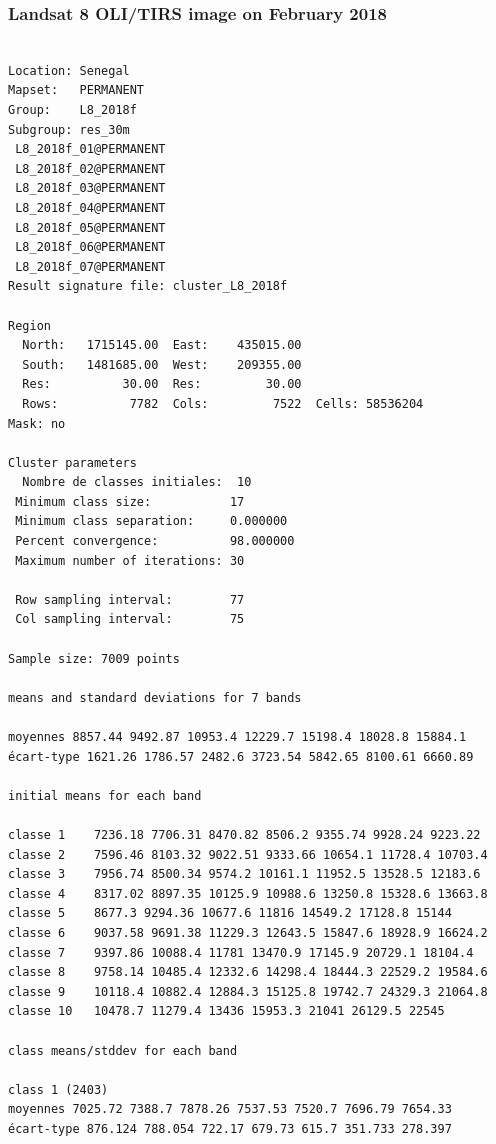 \documentclass[earth,article,submit,pdftex,moreauthors]{Definitions/mdpi}
\begin{document}
\subsubsection[\appendixname~\thesubsubsection]{Landsat 8 OLI/TIRS image on February 2018}
\begin{scriptsize}
\begin{verbatim}

Location: Senegal
Mapset:   PERMANENT
Group:    L8_2018f
Subgroup: res_30m
 L8_2018f_01@PERMANENT
 L8_2018f_02@PERMANENT
 L8_2018f_03@PERMANENT
 L8_2018f_04@PERMANENT
 L8_2018f_05@PERMANENT
 L8_2018f_06@PERMANENT
 L8_2018f_07@PERMANENT
Result signature file: cluster_L8_2018f

Region
  North:   1715145.00  East:    435015.00
  South:   1481685.00  West:    209355.00
  Res:          30.00  Res:         30.00
  Rows:          7782  Cols:         7522  Cells: 58536204
Mask: no

Cluster parameters
  Nombre de classes initiales: 	10
 Minimum class size:           17
 Minimum class separation:     0.000000
 Percent convergence:          98.000000
 Maximum number of iterations: 30

 Row sampling interval:        77
 Col sampling interval:        75

Sample size: 7009 points

means and standard deviations for 7 bands

moyennes 8857.44 9492.87 10953.4 12229.7 15198.4 18028.8 15884.1
écart-type 1621.26 1786.57 2482.6 3723.54 5842.65 8100.61 6660.89

initial means for each band

classe 1    7236.18 7706.31 8470.82 8506.2 9355.74 9928.24 9223.22
classe 2    7596.46 8103.32 9022.51 9333.66 10654.1 11728.4 10703.4
classe 3    7956.74 8500.34 9574.2 10161.1 11952.5 13528.5 12183.6
classe 4    8317.02 8897.35 10125.9 10988.6 13250.8 15328.6 13663.8
classe 5    8677.3 9294.36 10677.6 11816 14549.2 17128.8 15144
classe 6    9037.58 9691.38 11229.3 12643.5 15847.6 18928.9 16624.2
classe 7    9397.86 10088.4 11781 13470.9 17145.9 20729.1 18104.4
classe 8    9758.14 10485.4 12332.6 14298.4 18444.3 22529.2 19584.6
classe 9    10118.4 10882.4 12884.3 15125.8 19742.7 24329.3 21064.8
classe 10   10478.7 11279.4 13436 15953.3 21041 26129.5 22545

class means/stddev for each band

class 1 (2403)
moyennes 7025.72 7388.7 7878.26 7537.53 7520.7 7696.79 7654.33
écart-type 876.124 788.054 722.17 679.73 615.7 351.733 278.397


\end{verbatim}
\end{scriptsize}
\end{document}
